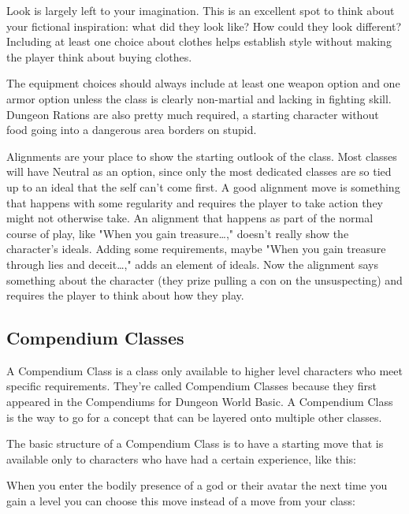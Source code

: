  

Look is largely left to your imagination. This is an excellent spot to think about your fictional inspiration: what did they look like? How could they look different? Including at least one choice about clothes helps establish style without making the player think about buying clothes.

 

The equipment choices should always include at least one weapon option and one armor option unless the class is clearly non-martial and lacking in fighting skill. Dungeon Rations are also pretty much required, a starting character without food going into a dangerous area borders on stupid.

 

Alignments are your place to show the starting outlook of the class. Most classes will have Neutral as an option, since only the most dedicated classes are so tied up to an ideal that the self can't come first. A good alignment move is something that happens with some regularity and requires the player to take action they might not otherwise take. An alignment that happens as part of the normal course of play, like "When you gain treasure…," doesn't really show the character's ideals. Adding some requirements, maybe "When you gain treasure through lies and deceit…," adds an element of ideals. Now the alignment says something about the character (they prize pulling a con on the unsuspecting) and requires the player to think about how they play.

 
\subsection{Compendium Classes}    
 

A Compendium Class is a class only available to higher level characters who meet specific requirements. They're called Compendium Classes because they first appeared in the Compendiums for Dungeon World Basic. A Compendium Class is the way to go for a concept that can be layered onto multiple other classes.

 

The basic structure of a Compendium Class is to have a starting move that is available only to characters who have had a certain experience, like this:

 
\startExample
When you enter the bodily presence of a god or their avatar the next time you gain a level you can choose this move instead of a move from your class:
\stopExample
 
